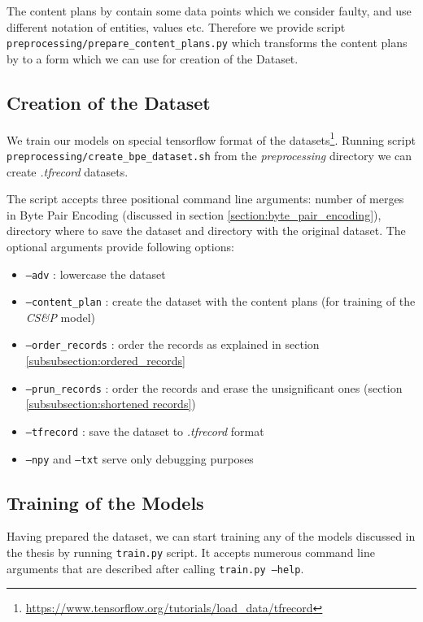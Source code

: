 The content plans by \citet{puduppully2019datatotext} contain some data points which we consider faulty, and use different notation of entities, values etc. Therefore we provide script \texttt{preprocessing/prepare\_content\_plans.py} which transforms the content plans by \citet{puduppully2019datatotext} to a form which we can use for creation of the Dataset.

\subsection{Creation of the Dataset}

We train our models on special tensorflow format of the datasets\footnote{\url{https://www.tensorflow.org/tutorials/load_data/tfrecord}}. Running script \texttt{preprocessing/create\_bpe\_dataset.sh} from the \emph{preprocessing} directory we can create \emph{.tfrecord} datasets.

The script accepts three positional command line arguments: number of merges in Byte Pair Encoding (discussed in section \ref{section:byte_pair_encoding}), directory where to save the dataset and directory with the original dataset. The optional arguments provide following options:
\begin{itemize}
    \item \texttt{--adv} : lowercase the dataset
    \item \texttt{--content\_plan} : create the dataset with the content plans (for training of the \emph{CS\&P} model)
    \item \texttt{--order\_records} : order the records as explained in section \ref{subsubsection:ordered_records}
    \item \texttt{--prun\_records} : order the records and erase the unsignificant ones (section \ref{subsubsection:shortened records})
    \item \texttt{--tfrecord} : save the dataset to \emph{.tfrecord} format
    \item \texttt{--npy} and \texttt{--txt} serve only debugging purposes
\end{itemize}

\subsection{Training of the Models}

Having prepared the dataset, we can start training any of the models discussed in the thesis by running \texttt{train.py} script. It accepts numerous command line arguments that are described after calling \texttt{train.py --help}.

